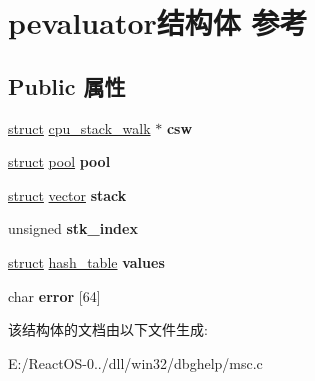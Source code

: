 \hypertarget{structpevaluator}{}\section{pevaluator结构体 参考}
\label{structpevaluator}
\subsection*{Public 属性}
\begin{DoxyCompactItemize}
\item 
\mbox{\label{structpevaluator_a5e565c83f91786944d5f3c22641c7df5}} 
\hyperlink{interfacestruct}{struct} \hyperlink{structcpu__stack__walk}{cpu\+\_\+stack\+\_\+walk} $\ast$ {\bfseries csw}
\item 
\mbox{\label{structpevaluator_ad91aa4bba4b954ca366cbda975f7524f}} 
\hyperlink{interfacestruct}{struct} \hyperlink{structpool}{pool} {\bfseries pool}
\item 
\mbox{\label{structpevaluator_aaf92a3596af64f0e9f974bea8f8f49bf}} 
\hyperlink{interfacestruct}{struct} \hyperlink{structvector}{vector} {\bfseries stack}
\item 
\mbox{\label{structpevaluator_abded2482fce311cb2930b22214069d53}} 
unsigned {\bfseries stk\+\_\+index}
\item 
\mbox{\label{structpevaluator_a064d882aebd57e7ac6bdb389e55d54e3}} 
\hyperlink{interfacestruct}{struct} \hyperlink{structhash__table}{hash\+\_\+table} {\bfseries values}
\item 
\mbox{\label{structpevaluator_a3a6faa87f3b34215b5843bf90742de57}} 
char {\bfseries error} \mbox{[}64\mbox{]}
\end{DoxyCompactItemize}


该结构体的文档由以下文件生成\+:\begin{DoxyCompactItemize}
\item 
E\+:/\+React\+O\+S-\/0../dll/win32/dbghelp/msc.\+c\end{DoxyCompactItemize}

